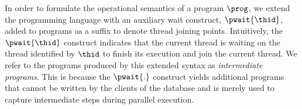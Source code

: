%
%
%
%
%
%
%


In order to formulate the operational semantics of a program $\prog$, we extend the programming language with an auxiliary wait construct, \(\pwait{\thid} \), added to programs as a suffix to denote thread joining points.
Intuitively, the \( \pwait{\thid} \) construct indicates that the current thread is waiting on the thread identified by \( \thid \) to finish its execution and join the current thread. We refer to the programs produced by this extended syntax as \emph{intermediate programs}. This is because the $\pwait{.}$ construct yields additional programs that cannot be written by the clients of the database and is merely used to capture intermediate steps during parallel execution. 
%

